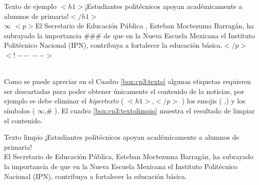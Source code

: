 \begin{mygraybox}[label={box:cp3:texto}]{Texto de ejemplo} 
$<h1>$¡Estudiantes politécnicos apoyan académicamente a alumnos de primaria!$</h1>$\\

$\infty$
$<p>$El Secretario de Educación Pública \Tribar[1][blue][blue!50][blue!20], Esteban Moctezuma Barragán, ha subrayado la importancia \#\#\# de que en la Nueva Escuela Mexicana el Instituto Politécnico Nacional (IPN)\dSmiley, contribuya a fortalecer la educación básica.$</p>$\\
$<!--\ -->$
\end{mygraybox}
\ \\
Como se puede apreciar en el Cuadro \ref{box:cp3:texto} algunas etiquetas requieren ser descartadas para poder obtener únicamente el contenido de la noticias, por ejemplo se debe eliminar el \textit{hipertexto} ( $<h1>$,$</p>$ ) los emojis ( \dSmiley,\Tribar[1][blue][blue!50][blue!20] ) y los símbolos ( $\infty$,\# ). El cuadro \ref{box:cp3:textolimpio} muestra el resultado de limpiar el contenido.\\

\begin{mygraybox}[label={box:cp3:textolimpio}]{Texto limpio} 
¡Estudiantes politécnicos apoyan académicamente a alumnos de primaria!\\

El Secretario de Educación Pública, Esteban Moctezuma Barragán, ha subrayado la importancia  de que en la Nueva Escuela Mexicana el Instituto Politécnico Nacional (IPN), contribuya a fortalecer la educación básica.
\end{mygraybox}



